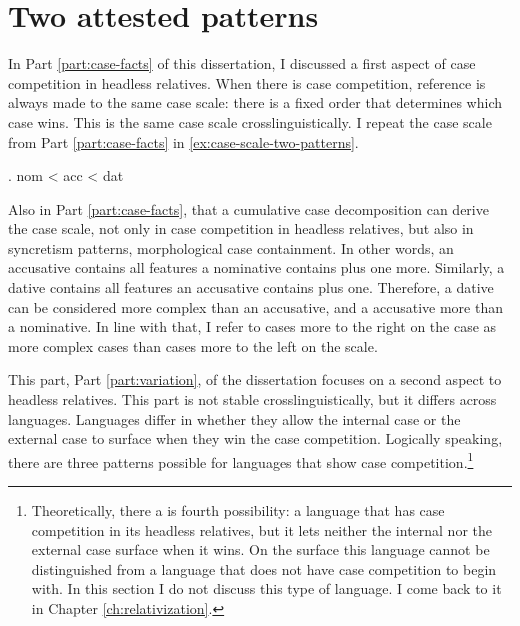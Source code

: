 
\chapter{Two attested patterns}

In Part \ref{part:case-facts} of this dissertation, I discussed a first aspect of case competition in headless relatives. When there is case competition, reference is always made to the same case scale: there is a fixed order that determines which case wins. This is the same case scale crosslinguistically. I repeat the case scale from Part \ref{part:case-facts} in \ref{ex:case-scale-two-patterns}.

\ex. \ac{nom} < \ac{acc} < \ac{dat}\label{ex:case-scale-two-patterns}

Also in Part \ref{part:case-facts}, that a cumulative case decomposition can derive the case scale, not only in case competition in headless relatives, but also in syncretism patterns, morphological case containment. In other words, an accusative contains all features a nominative contains plus one more. Similarly, a dative contains all features an accusative contains plus one. Therefore, a dative can be considered more complex than an accusative, and a accusative more than a nominative. In line with that, I refer to cases more to the right on the case as more complex cases than cases more to the left on the scale.

This part, Part \ref{part:variation}, of the dissertation focuses on a second aspect to headless relatives. This part is not stable crosslinguistically, but it differs across languages. Languages differ in whether they allow the internal case or the external case to surface when they win the case competition. Logically speaking, there are three patterns possible for languages that show case competition.\footnote{
Theoretically, there a is fourth possibility: a language that has case competition in its headless relatives, but it lets neither the internal nor the external case surface when it wins. On the surface this language cannot be distinguished from a language that does not have case competition to begin with. In this section I do not discuss this type of language. I come back to it in Chapter \ref{ch:relativization}.
}

